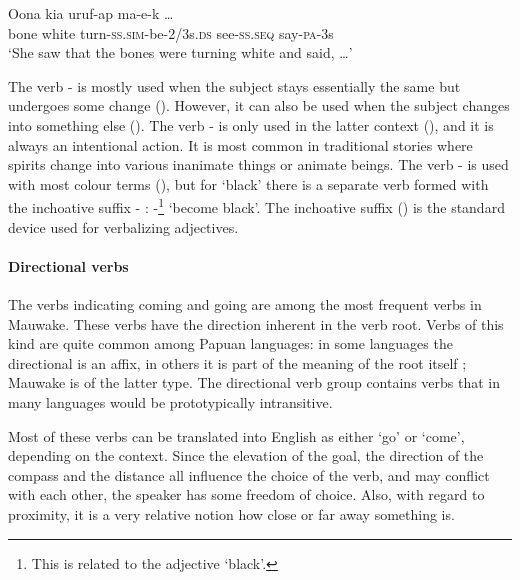 \ea%
\label{ex:x279}
\gll Oona kia  uruf-ap ma-e-k {\dots} \\
bone white turn-\textsc{ss}.\textsc{sim}-be-2/3s.\textsc{ds} see-\textsc{ss}.\textsc{seq} say-\textsc{pa}-3s \\
\glt`She saw that the bones were turning white and said, {\dots}'
\z

The verb - is mostly used when the subject stays essentially the same but undergoes some change (). However, it can also be used when the subject changes into something else (). The verb - is only used in the latter context (), and it is always an intentional action. It is most common in traditional stories where spirits change into various inanimate things or animate beings. The verb - is used with most colour terms (), but for `black' there is a separate verb formed with the inchoative suffix \nobreakdash- : -\footnote{This is related to the adjective  `black'.} `become black'. The inchoative suffix () is the standard device used for verbalizing adjectives. 

\paragraph[Directional verbs]{Directional verbs}
{}
The verbs indicating coming and going are among the most frequent verbs in Mauwake. These verbs have the direction inherent in the verb root. Verbs of this kind are quite common among Papuan languages: in some languages the directional is an affix, in others it is part of the meaning of the root itself \citep[149]{Foley1986}; Mauwake is of the latter type. The directional verb group contains verbs that in many languages would be prototypically intransitive.

Most of these verbs can be translated into English as either `go' or `come', depending on the context. Since the elevation of the goal, the direction of the compass and the distance all influence the choice of the verb, and may conflict with each other, the speaker has some freedom of choice. Also, with regard to proximity, it is a very relative notion how close or far away something is.

